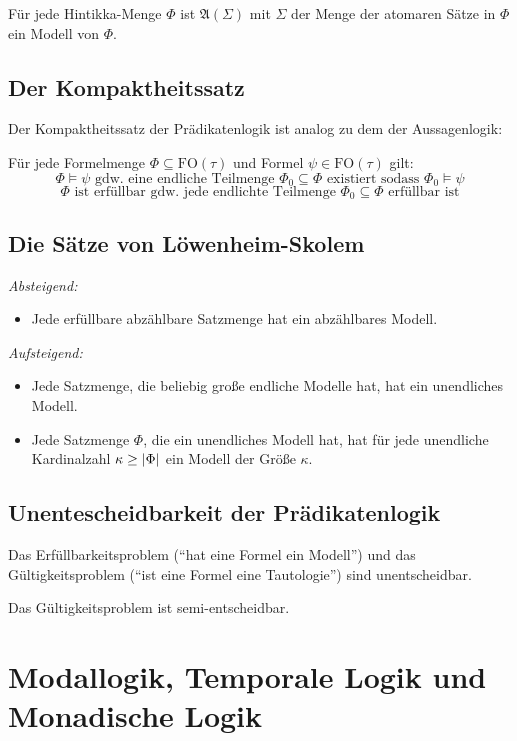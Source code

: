 \documentclass[a4paper,parskip=half*,DIV=15,fontsize=11pt]{scrartcl}
\DeclarePairedDelimiter\abs{\lvert}{\rvert}
\newcommand{\A}{\mathfrak{A}}
\newcommand{\FO}{\mathrm{FO}}
\begin{document}
Für jede Hintikka-Menge $\Phi$ ist $\A(\Sigma)$ mit $\Sigma$ der Menge der atomaren Sätze in $\Phi$ ein Modell von $\Phi$.

\subsection{Der Kompaktheitssatz}

Der Kompaktheitssatz der Prädikatenlogik ist analog zu dem der Aussagenlogik:

Für jede Formelmenge $\Phi \subseteq \FO(\tau)$ und Formel $\psi \in \FO(\tau)$ gilt:
\[\Phi \models \psi \text{ gdw.\ eine endliche Teilmenge $\Phi_0 \subseteq \Phi$ existiert sodass } \Phi_0 \models \psi\]
\[\Phi \text{ ist erfüllbar gdw.\ jede endlichte Teilmenge $\Phi_0 \subseteq \Phi$ erfüllbar ist}\]

\subsection{Die Sätze von Löwenheim-Skolem}

\emph{Absteigend:}
\begin{itemize}
\item[] Jede erfüllbare abzählbare Satzmenge hat ein abzählbares Modell.
\end{itemize}

\emph{Aufsteigend:}
\begin{itemize}
\item Jede Satzmenge, die beliebig große endliche Modelle hat, hat ein unendliches Modell.
\item Jede Satzmenge $\Phi$, die ein unendliches Modell hat, hat für jede unendliche Kardinalzahl $\kappa \ge \abs{\Phi}$ ein Modell der Größe $\kappa$.
\end{itemize}

\subsection{Unentescheidbarkeit der Prädikatenlogik}

Das Erfüllbarkeitsproblem (``hat eine Formel ein Modell'') und das Gültigkeitsproblem (``ist eine Formel eine Tautologie'') sind unentscheidbar.

Das Gültigkeitsproblem ist semi-entscheidbar.

\section{Modallogik, Temporale Logik und Monadische Logik}
\end{document}
